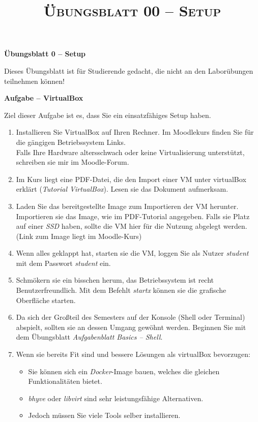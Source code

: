 \documentclass[paper=a4,fontsize=11pt]{scrartcl}%
\title{	
\normalfont \normalsize 
\textsc{Übungsblatt 00 -- Setup}
}
\numberwithin{equation}{section}
\begin{document}
\begin{center}\Large{\textbf{Übungsblatt 0 -- Setup}}
\end{center}
Dieses Übungsblatt ist für Studierende gedacht, die nicht an den Laborübungen teilnehmen können!
\begin{center}\Large{\textbf{Aufgabe -- VirtualBox}}\end{center}\vskip0.25in
Ziel dieser Aufgabe ist es, dass Sie ein einsatzfähiges Setup haben.
\begin{enumerate}
	\item Installieren Sie VirtualBox auf Ihren Rechner. Im Moodlekurs finden Sie für die gängigen Betriebssystem Links.\\
	Falls Ihre Hardware altersschwach oder keine Virtualisierung unterstützt, schreiben sie mir im Moodle-Forum.
	\item Im Kurs liegt eine PDF-Datei, die den Import einer VM unter virtualBox erklärt (\emph{Tutorial VirtualBox}). Lesen sie das Dokument aufmerksam.
	\item Laden Sie das bereitgestellte Image zum Importieren der VM herunter. Importieren sie das Image, wie im PDF-Tutorial angegeben. Falls sie Platz auf einer \emph{SSD} haben, sollte die VM hier für die Nutzung abgelegt werden.\\
	(Link zum Image liegt im Moodle-Kurs)
	\item Wenn alles geklappt hat, starten sie die VM, loggen Sie als Nutzer \emph{student} mit dem Passwort \emph{student} ein.
	\item Schmökern sie ein bisschen herum, das Betriebssystem ist recht Benutzerfreundlich. Mit dem Befehlt \emph{startx} können sie die grafische Oberfläche starten.
	\item Da sich der Großteil des Semesters auf der Konsole (Shell oder Terminal) abspielt, sollten sie an dessen Umgang gewöhnt werden. Beginnen Sie mit dem Übungsblatt \emph{Aufgabenblatt Basics -- Shell}.
	\item Wenn sie bereits Fit sind und bessere Lösungen als virtualBox bevorzugen:
	\begin{itemize}
		\item Sie können sich ein \emph{Docker}-Image bauen, welches die gleichen Funktionalitäten bietet.
		\item \emph{bhyve} oder \emph{libvirt} sind sehr leistungsfähige Alternativen.
		\item Jedoch müssen Sie viele Tools selber installieren.
	\end{itemize}
\end{enumerate}
\end{document}
